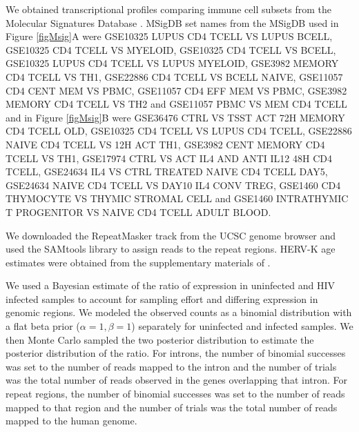 \documentclass[../sherrill-Mix_thesis.tex]{subfiles}
\begin{document}
		We obtained transcriptional profiles comparing immune cell subsets from the Molecular Signatures Database \citep{Subramanian2005}. MSigDB set names from the MSigDB used in Figure \ref{figMsig}A were GSE10325 LUPUS CD4 TCELL VS LUPUS BCELL, GSE10325 CD4 TCELL VS MYELOID, GSE10325 CD4 TCELL VS BCELL, GSE10325 LUPUS CD4 TCELL VS LUPUS MYELOID, GSE3982 MEMORY CD4 TCELL VS TH1, GSE22886 CD4 TCELL VS BCELL NAIVE, GSE11057 CD4 CENT MEM VS PBMC, GSE11057 CD4 EFF MEM VS PBMC, GSE3982 MEMORY CD4 TCELL VS TH2 and GSE11057 PBMC VS MEM CD4 TCELL and in Figure \ref{figMsig}B were GSE36476 CTRL VS TSST ACT 72H MEMORY CD4 TCELL OLD, GSE10325 CD4 TCELL VS LUPUS CD4 TCELL, GSE22886 NAIVE CD4 TCELL VS 12H ACT TH1, GSE3982 CENT MEMORY CD4 TCELL VS TH1, GSE17974 CTRL VS ACT IL4 AND ANTI IL12 48H CD4 TCELL, GSE24634 IL4 VS CTRL TREATED NAIVE CD4 TCELL DAY5, GSE24634 NAIVE CD4 TCELL VS DAY10 IL4 CONV TREG, GSE1460 CD4 THYMOCYTE VS THYMIC STROMAL CELL and GSE1460 INTRATHYMIC T PROGENITOR VS NAIVE CD4 TCELL ADULT BLOOD. 
		
		We downloaded the RepeatMasker track from the UCSC genome browser \citep{Kent2002a} and used the SAMtools library \citep{Li2009a} to assign reads to the repeat regions. HERV-K age estimates were obtained from the supplementary materials of \citet{Subramanian2011}.

		 We used a Bayesian estimate of the ratio of expression in uninfected and HIV infected samples to account for sampling effort and differing expression in genomic regions. We modeled the observed counts as a binomial distribution with a flat beta prior ($\alpha=1,\beta=1$) separately for uninfected and infected samples. We then Monte Carlo sampled the two posterior distribution to estimate the posterior distribution of the ratio. For introns, the number of binomial successes was set to the number of reads mapped to the intron and the number of trials was the total number of reads observed in the genes overlapping that intron. For repeat regions, the number of binomial successes was set to the number of reads mapped to that region and the number of trials was the total number of reads mapped to the human genome.
\end{document}

